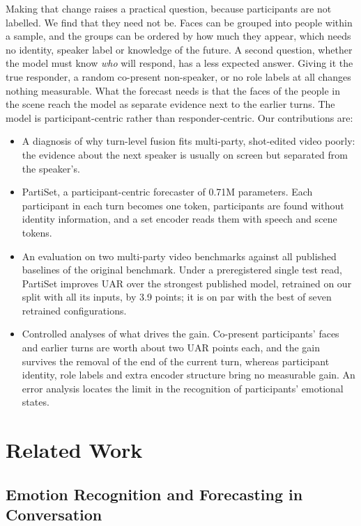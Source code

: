 \documentclass[11pt]{article}
\newcommand{\model}{PartiSet}
\begin{document}
Making that change raises a practical question, because participants are not labelled. We find that they need not
be. Faces can be grouped into people within a sample, and the groups can be ordered by how much they appear, which
needs no identity, speaker label or knowledge of the future. A second question, whether the model must know \emph{who}
will respond, has a less expected answer. Giving it the true responder, a random co-present non-speaker, or no role
labels at all changes nothing measurable. What the forecast needs is that the faces of the people in the scene reach
the model as separate evidence next to the earlier turns. The model is participant-centric rather than
responder-centric. Our contributions are:
\begin{itemize}[leftmargin=*,itemsep=1pt,topsep=2pt]
\item A diagnosis of why turn-level fusion fits multi-party, shot-edited video poorly: the evidence about the next
speaker is usually on screen but separated from the speaker's.
\item \model{}, a participant-centric forecaster of 0.71M parameters. Each participant in each turn becomes one
token, participants are found without identity information, and a set encoder reads them with speech and scene
tokens.
\item An evaluation on two multi-party video benchmarks against all published baselines of the original benchmark.
Under a preregistered single test read, \model{} improves UAR over the strongest published model, retrained on our
split with all its inputs, by 3.9 points; it is on par with the best of seven retrained configurations.
\item Controlled analyses of what drives the gain. Co-present participants' faces and earlier turns are worth about
two UAR points each, and the gain survives the removal of the end of the current turn, whereas participant identity,
role labels and extra encoder structure bring no measurable gain. An error analysis locates the limit in the
recognition of participants' emotional states.
\end{itemize}

\section{Related Work}

\subsection{Emotion Recognition and Forecasting in Conversation}
\end{document}
